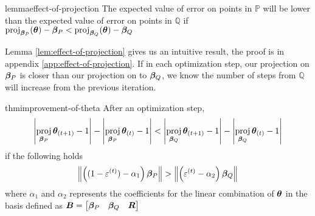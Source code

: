 \documentclass{article} %
\DeclareMathOperator{\proj}{proj}
\newcommand{\norm}[1]{\left\lVert#1\right\rVert}
\begin{document}
	\begin{restatable}{lemma}{effect-of-projection}
		\label{lem:effect-of-projection}
		The expected value of error on points in $\mathbb{P}$ will be lower than the expected value of error on points in $\mathbb{Q}$ if $\proj_{\vbeta_P}(\vtheta) - \vbeta_P < \proj_{\vbeta_Q}(\vtheta) - \vbeta_Q$
	\end{restatable}
	
	Lemma \ref{lem:effect-of-projection} gives us an intuitive result, the proof is in appendix \ref{app:effect-of-projection}. If in each optimization step, our projection on ${\bm{\beta}}_P$ is closer than our projection on to ${\bm{\beta}}_Q$, we know the number of steps from $\mathbb{Q}$ will increase from the previous iteration.
	\begin{restatable}{thm}{improvement-of-theta}
		\label{thm:improvement-of-theta}
		After an optimization step, 
		\begin{equation*}
			\left|\proj_{\vbeta_P}\vtheta_{(t+1)} -1 \right| - \left|\proj_{\vbeta_P}\vtheta_{(t)} -1 \right| <  \left|\proj_{\vbeta_Q}\vtheta_{(t+1)} - 1\right| - \left|\proj_{\vbeta_Q}\vtheta_{(t)} - 1\right|
		\end{equation*}
			  if the following holds
		\begin{equation}
			\norm{\left((1-\varepsilon^{(t)}) - \alpha_1\right)\vbeta_P} > \norm{\left(\varepsilon^{(t)} - \alpha_2\right)\vbeta_Q}
		\end{equation}
		where $\alpha_1$ and $\alpha_2$ represents the coefficients for the linear combination of ${\bm{\theta}}$ in the basis defined as ${\bm{B}} = \begin{bmatrix} {\bm{\beta}}_P & {\bm{\beta}}_Q & {\bm{R}}\end{bmatrix}$
	\end{restatable}
\end{document}
